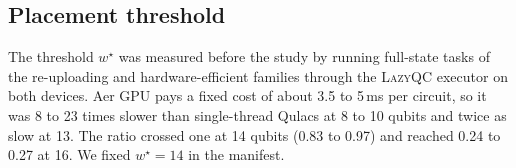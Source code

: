 \subsection{Placement threshold}
The threshold $w^\star$ was measured before the study by running full-state tasks of the re-uploading and hardware-efficient families through the \textsc{LazyQC} executor on both devices. Aer GPU pays a fixed cost of about 3.5 to 5\,ms per circuit, so it was 8 to 23 times slower than single-thread Qulacs at 8 to 10 qubits and twice as slow at 13. The ratio crossed one at 14 qubits (0.83 to 0.97) and reached 0.24 to 0.27 at 16. We fixed $w^\star=14$ in the manifest.
